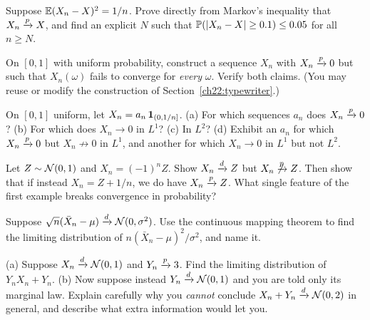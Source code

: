 \begin{exercise}
\label{ch22:exr-markov}
Suppose $\operatorname{\mathbb{E}}(X_n - X)^2 = 1/n$. Prove directly from Markov's inequality that
$X_n\xrightarrow{p} X$, and find an explicit $N$ such that $\operatorname{\mathbb{P}}(\lvert X_n - X\rvert\ge 0.1)\le 0.05$ for
all $n\ge N$.
\end{exercise}

\begin{exercise}
\label{ch22:exr-typewriter}
On $[0,1]$ with uniform probability, construct a sequence $X_n$ with $X_n\xrightarrow{p}0$ but
such that $X_n(\omega)$ fails to converge for \emph{every} $\omega$. Verify both
claims. (You may reuse or modify the construction of
Section~\ref{ch22:typewriter}.)
\end{exercise}

\begin{exercise}
\label{ch22:exr-giant}
On $[0,1]$ uniform, let $X_n = a_n\,\mathbf{1}_{(0,1/n]}$. (a) For which sequences $a_n$ does
$X_n\xrightarrow{p}0$? (b) For which does $X_n\to0$ in $L^1$? (c) In $L^2$? (d) Exhibit an $a_n$
for which $X_n\xrightarrow{p}0$ but $X_n\not\to0$ in $L^1$, and another for which $X_n\to0$ in
$L^1$ but not $L^2$.
\end{exercise}

\begin{exercise}
\label{ch22:exr-d-not-p}
Let $Z\sim\mathcal{N}(0,1)$ and $X_n = (-1)^n Z$. Show $X_n\xrightarrow{d} Z$ but $X_n\not\xrightarrow{p} Z$.
Then show that if instead $X_n = Z + 1/n$, we do have $X_n\xrightarrow{p} Z$. What single feature
of the first example breaks convergence in probability?
\end{exercise}

\begin{exercise}
\label{ch22:exr-cmt}
Suppose $\sqrt n(\bar X_n - \mu)\xrightarrow{d}\mathcal{N}(0,\sigma^2)$. Use the continuous mapping
theorem to find the limiting distribution of $n(\bar X_n - \mu)^2/\sigma^2$, and name
it.
\end{exercise}

\begin{exercise}
\label{ch22:exr-slutsky}
(a) Suppose $X_n\xrightarrow{d}\mathcal{N}(0,1)$ and $Y_n\xrightarrow{p}3$. Find the limiting distribution of
$Y_n X_n + Y_n$. (b) Now suppose instead $Y_n\xrightarrow{d}\mathcal{N}(0,1)$ and you are told only
its marginal law. Explain carefully why you \emph{cannot} conclude
$X_n + Y_n\xrightarrow{d}\mathcal{N}(0,2)$ in general, and describe what extra information would let
you.
\end{exercise}

